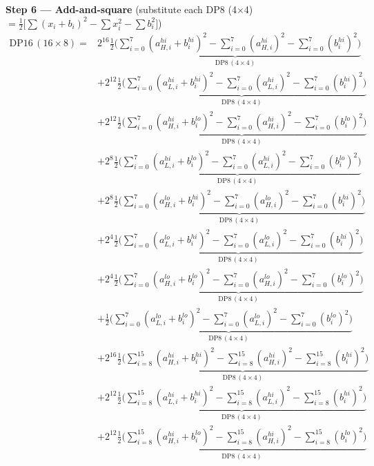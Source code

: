 \documentclass[fleqn]{article}
\newcommand{\DPop}[3]{\mathrm{DP#1}\,(#2\!\times\!#3)}
\begin{document}
\textbf{Step 6 --- Add-and-square}\quad
{\small(substitute each DP8 (4$\times$4) $= \tfrac{1}{2}\big[\sum(x_i{+}b_i)^2 - \sum x_i^2 - \sum b_i^2\big]$)}
\begin{align*}
\DPop{16}{16}{8} = {}
  & 2^{16}\underbrace{\tfrac{1}{2}\Big(\sum_{i=0}^{7}(a_{H,i}^{hi}{+}b_i^{hi})^2 - \sum_{i=0}^{7}(a_{H,i}^{hi})^2 - \sum_{i=0}^{7}(b_i^{hi})^2\Big)}_{\DPop{8}{4}{4}} \\[0.5em]
  & + 2^{12}\underbrace{\tfrac{1}{2}\Big(\sum_{i=0}^{7}(a_{L,i}^{hi}{+}b_i^{hi})^2 - \sum_{i=0}^{7}(a_{L,i}^{hi})^2 - \sum_{i=0}^{7}(b_i^{hi})^2\Big)}_{\DPop{8}{4}{4}} \\[0.5em]
  & + 2^{12}\underbrace{\tfrac{1}{2}\Big(\sum_{i=0}^{7}(a_{H,i}^{hi}{+}b_i^{lo})^2 - \sum_{i=0}^{7}(a_{H,i}^{hi})^2 - \sum_{i=0}^{7}(b_i^{lo})^2\Big)}_{\DPop{8}{4}{4}} \\[0.5em]
  & + 2^{8}\underbrace{\tfrac{1}{2}\Big(\sum_{i=0}^{7}(a_{L,i}^{hi}{+}b_i^{lo})^2 - \sum_{i=0}^{7}(a_{L,i}^{hi})^2 - \sum_{i=0}^{7}(b_i^{lo})^2\Big)}_{\DPop{8}{4}{4}} \\[0.5em]
  & + 2^{8}\underbrace{\tfrac{1}{2}\Big(\sum_{i=0}^{7}(a_{H,i}^{lo}{+}b_i^{hi})^2 - \sum_{i=0}^{7}(a_{H,i}^{lo})^2 - \sum_{i=0}^{7}(b_i^{hi})^2\Big)}_{\DPop{8}{4}{4}} \\[0.5em]
  & + 2^{4}\underbrace{\tfrac{1}{2}\Big(\sum_{i=0}^{7}(a_{L,i}^{lo}{+}b_i^{hi})^2 - \sum_{i=0}^{7}(a_{L,i}^{lo})^2 - \sum_{i=0}^{7}(b_i^{hi})^2\Big)}_{\DPop{8}{4}{4}} \\[0.5em]
  & + 2^{4}\underbrace{\tfrac{1}{2}\Big(\sum_{i=0}^{7}(a_{H,i}^{lo}{+}b_i^{lo})^2 - \sum_{i=0}^{7}(a_{H,i}^{lo})^2 - \sum_{i=0}^{7}(b_i^{lo})^2\Big)}_{\DPop{8}{4}{4}} \\[0.5em]
  & + \underbrace{\tfrac{1}{2}\Big(\sum_{i=0}^{7}(a_{L,i}^{lo}{+}b_i^{lo})^2 - \sum_{i=0}^{7}(a_{L,i}^{lo})^2 - \sum_{i=0}^{7}(b_i^{lo})^2\Big)}_{\DPop{8}{4}{4}} \\[0.5em]
  & + 2^{16}\underbrace{\tfrac{1}{2}\Big(\sum_{i=8}^{15}(a_{H,i}^{hi}{+}b_i^{hi})^2 - \sum_{i=8}^{15}(a_{H,i}^{hi})^2 - \sum_{i=8}^{15}(b_i^{hi})^2\Big)}_{\DPop{8}{4}{4}} \\[0.5em]
  & + 2^{12}\underbrace{\tfrac{1}{2}\Big(\sum_{i=8}^{15}(a_{L,i}^{hi}{+}b_i^{hi})^2 - \sum_{i=8}^{15}(a_{L,i}^{hi})^2 - \sum_{i=8}^{15}(b_i^{hi})^2\Big)}_{\DPop{8}{4}{4}} \\[0.5em]
  & + 2^{12}\underbrace{\tfrac{1}{2}\Big(\sum_{i=8}^{15}(a_{H,i}^{hi}{+}b_i^{lo})^2 - \sum_{i=8}^{15}(a_{H,i}^{hi})^2 - \sum_{i=8}^{15}(b_i^{lo})^2\Big)}_{\DPop{8}{4}{4}} \\[0.5em]

\end{align*}
\end{document}

